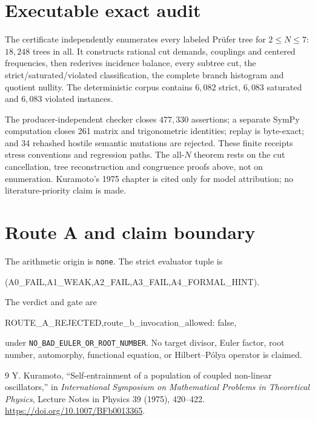\documentclass[10pt]{article}
\begin{document}
{\small
\section{Executable exact audit}
The certificate independently enumerates every labeled Pr\"ufer tree for
$2\le N\le7$: $18{,}248$ trees in all.  It constructs rational cut demands,
couplings and centered frequencies, then rederives incidence balance, every
subtree cut, the strict/saturated/violated classification, the complete
branch histogram and quotient nullity.  The deterministic corpus contains
$6{,}082$ strict, $6{,}083$ saturated and $6{,}083$ violated instances.

The producer-independent checker closes $477{,}330$ assertions; a separate
SymPy computation closes 261 matrix and trigonometric identities; replay is
byte-exact; and 34 rehashed hostile semantic mutations are rejected.  These
finite receipts stress conventions and regression paths.  The all-$N$
theorem rests on the cut cancellation, tree reconstruction and congruence
proofs above, not on enumeration.  Kuramoto's 1975 chapter is cited only for
model attribution; no literature-priority claim is made.

\section{Route A and claim boundary}

The arithmetic origin is \texttt{none}.  The strict evaluator tuple is
\begin{center}\small\ttfamily
(A0\_FAIL,A1\_WEAK,A2\_FAIL,A3\_FAIL,A4\_FORMAL\_HINT).
\end{center}
The verdict and gate are
\begin{center}\small\ttfamily
ROUTE\_A\_REJECTED,\qquad route\_b\_invocation\_allowed: false,
\end{center}
under \texttt{NO\_BAD\_EULER\_OR\_ROOT\_NUMBER}.  No target divisor, Euler factor,
root number, automorphy, functional equation, or Hilbert--P\'olya operator is
claimed.

\begin{thebibliography}{9}
 Y. Kuramoto, ``Self-entrainment of a population of coupled
non-linear oscillators,'' in \emph{International Symposium on Mathematical
Problems in Theoretical Physics}, Lecture Notes in Physics 39 (1975),
420--422. \url{https://doi.org/10.1007/BFb0013365}.
\end{thebibliography}
}
\end{document}
